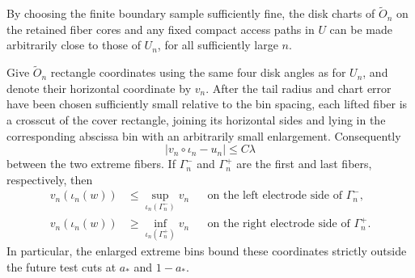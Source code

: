 \begin{lemma}\label{lem:slits-cover}
By choosing the finite boundary sample sufficiently fine, the disk
charts of $\widetilde O_n$ on the retained fiber cores and any fixed
compact access paths in $U$ can be made arbitrarily close to those
of $U_n$, for all sufficiently large $n$.

Give $\widetilde O_n$ rectangle coordinates using the same four disk
angles as for $U_n$, and denote their horizontal coordinate by
$v_n$.  After the tail radius and chart error have been chosen
sufficiently small relative to the bin spacing, each lifted fiber
is a crosscut of the cover rectangle, joining its horizontal sides
and lying in the corresponding abscissa bin with an arbitrarily
small enlargement.  Consequently
\begin{equation}\label{eq:slits-chart-matching}
 |v_n\circ\iota_n-u_n|\leq C\lambda
\end{equation}
between the two extreme fibers.  If $\Gamma_n^-$ and $\Gamma_n^+$
are the first and last fibers, respectively, then
\begin{align*}
 v_n(\iota_n(w))&\leq
     \sup_{\iota_n(\Gamma_n^-)}v_n
       &&\text{on the left electrode side of }\Gamma_n^-,\\
 v_n(\iota_n(w))&\geq
     \inf_{\iota_n(\Gamma_n^+)}v_n
       &&\text{on the right electrode side of }\Gamma_n^+.
\end{align*}
In particular, the enlarged extreme bins bound these coordinates
strictly outside the future test cuts at $a_*$ and $1-a_*$.
\end{lemma}

